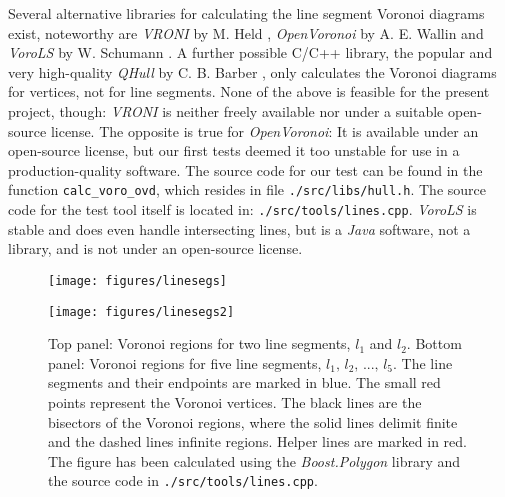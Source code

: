 Several alternative libraries for calculating the line segment Voronoi diagrams exist,
noteworthy are \textit{VRONI} by M. Held \cite{Held2001}, \textit{OpenVoronoi} by A. E. Wallin \cite{web_openvoronoi}
and \textit{VoroLS} by W. Schumann \cite{DiplomaSchumann}.
A further possible C/C++ library, the popular and very high-quality \textit{QHull} by C. B. Barber \cite{web_qhull},
only calculates the Voronoi diagrams for vertices, not for line segments.
None of the above is feasible for the present project, though: \textit{VRONI} is neither freely available nor under a
suitable open-source license.
The opposite is true for \textit{OpenVoronoi}: It is available under an open-source license, but our first tests
deemed it too unstable for use in a production-quality software. The source code for our test can be found in
the function \lstinline[language=C++]|calc_voro_ovd|, which resides in file \lstinline|./src/libs/hull.h|.
The source code for the test tool itself is located in: \lstinline|./src/tools/lines.cpp|.
\textit{VoroLS} is stable and does even handle intersecting lines, but is a \textit{Java}
software, not a library, and is not under an open-source license.


\label{sec:voronoi}
\begin{figure*}
	\begin{minipage}{1 \textwidth}
		\begin{center}
			\texttt{[image: figures/linesegs]}
		\end{center}
		\vspace{0.25cm}
	\end{minipage}
	\begin{minipage}{1 \textwidth}
		\vspace{0.25cm}
		\begin{center}
			\texttt{[image: figures/linesegs2]}
		\end{center}
	\end{minipage}
	\caption{Top panel: Voronoi regions for two line segments, $l_1$ and $l_2$.
		Bottom panel: Voronoi regions for five line segments, $l_1,\, l_2,\, ...,\, l_5$.
		The line segments and their endpoints are marked in blue. The small red points represent the Voronoi vertices.
		The black lines are the bisectors of the Voronoi regions, where the solid lines delimit finite and the dashed lines
		infinite regions. Helper lines are marked in red. The figure has been calculated using the \textit{Boost.Polygon} library
		\cite{web_boost_polygon_voronoi} and the source code in \lstinline|./src/tools/lines.cpp|.
		\label{fig:linesegs_voro}}
\end{figure*}



